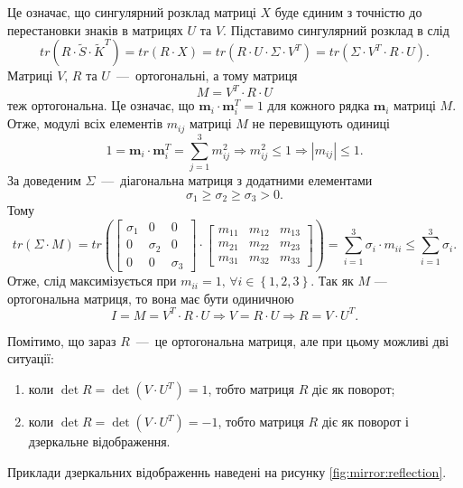 Це означає, що сингулярний розклад матриці $X$ буде єдиним з точністю до
перестановки знаків в матрицях $U$ та $V$.
Підставимо сингулярний розклад в слід
\begin{equation*}
  tr \left( R \cdot \tilde{S} \cdot \tilde{K}^T \right) =
  tr \left( R \cdot X \right) =
  tr \left( R \cdot U \cdot \Sigma \cdot V^T \right) =
  tr \left( \Sigma \cdot V^T \cdot R \cdot U \right).
\end{equation*}
Матриці $V, \, R$ та $U$~---~ортогональні, а тому матриця
\begin{equation*}
  M =
  V^T \cdot R \cdot U
\end{equation*}
теж ортогональна.
Це означає, що $ \boldsymbol{m}_i \cdot \boldsymbol{m}_i^T = 1$ для кожного рядка
$ \boldsymbol{m}_i$ матриці $M$.
Отже, модулі всіх елементів $m_{ij}$ матриці $M$ не перевищують одиниці
\begin{equation*}
  1 =
  \boldsymbol{m}_i \cdot \boldsymbol{m}_i^T =
  \sum \limits_{j = 1}^3 m_{ij}^2 \Rightarrow
  m_{ij}^2 \leq 1 \Rightarrow
  \left| m_{ij} \right| \leq 1.
\end{equation*}
За доведеним $ \Sigma $~---~діагональна матриця з додатними елементами
\begin{equation*}
  \sigma_1 \geq \sigma_2 \geq \sigma_3 > 0.
\end{equation*}
Тому
\begin{equation*}
  tr \left( \Sigma \cdot M \right) =
  tr \left(
  \begin{bmatrix}
    \sigma_1 & 0 & 0 \\
    0 & \sigma_2 & 0 \\
    0 & 0 & \sigma_3
  \end{bmatrix} \cdot
  \begin{bmatrix}
    m_{11} & m_{12} & m_{13} \\
    m_{21} & m_{22} & m_{23} \\
    m_{31} & m_{32} & m_{33}
  \end{bmatrix}
  \right) =
  \sum \limits_{i = 1}^3 \sigma_i \cdot m_{ii} \leq
  \sum \limits_{i = 1}^3 \sigma_i.
\end{equation*}
Отже, слід максимізується при
$m_{ii} = 1, \, \forall i \in \left\{ 1, 2, 3 \right\} $.
Так як $M$ --- ортогональна матриця, то вона має бути одиничною
\begin{equation*}
  I = M = V^T \cdot R \cdot U \Rightarrow
  V = R \cdot U \Rightarrow
  R = V \cdot U^T.
\end{equation*}

Помітимо, що зараз $R$~---~це ортогональна матриця,
але при цьому можливі дві ситуації:
\begin{enumerate}
  \item коли $ \det{R} = \det{ \left( V \cdot U^T \right) } = 1$,
  тобто матриця $R$ діє як поворот;
  \item коли $ \det{R} = \det{ \left( V \cdot U^T \right) } = -1$,
  тобто матриця $R$ діє як поворот і дзеркальне відображення.
\end{enumerate}
Приклади дзеркальних відображеннь наведені на рисунку
\ref{fig:mirror:reflection}.

